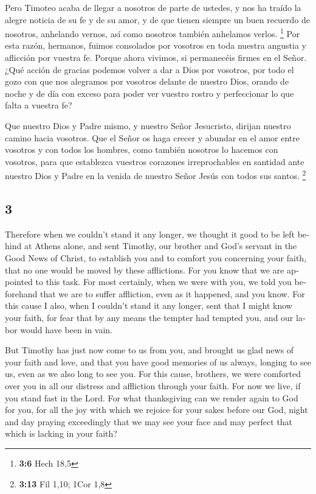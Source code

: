 \begin{paracol}{2}
 Pero Timoteo acaba de llegar a nosotros de parte de
ustedes, y nos ha traído la alegre noticia de su fe y de su amor, y de
que tienen siempre un buen recuerdo de nosotros, anhelando vernos, así
como nosotros también anhelamos verlos. \footnote{\textbf{3:6} Hech 18,5}
 Por esta razón, hermanos, fuimos consolados por vosotros
en toda nuestra angustia y aflicción por vuestra fe. 
Porque ahora vivimos, si permanecéis firmes en el Señor. 
¿Qué acción de gracias podemos volver a dar a Dios por vosotros, por
todo el gozo con que nos alegramos por vosotros delante de nuestro Dios,
 orando de noche y de día con exceso para poder ver
vuestro rostro y perfeccionar lo que falta a vuestra fe?

 Que nuestro Dios y Padre mismo, y nuestro Señor
Jesucristo, dirijan nuestro camino hacia vosotros.  Que
el Señor os haga crecer y abundar en el amor entre vosotros y con todos
los hombres, como también nosotros lo hacemos con vosotros,
 para que establezca vuestros corazones irreprochables en
santidad ante nuestro Dios y Padre en la venida de nuestro Señor Jesús
con todos sus santos. \footnote{\textbf{3:13} Fil 1,10; 1Cor 1,8}

\switchcolumn
\begin{otherlanguage}{english}

\hypertarget{section-5}{%
\section{3}\label{section-5}}

 Therefore when we couldn't stand it any longer, we
thought it good to be left behind at Athens alone,  and
sent Timothy, our brother and God's servant in the Good News of Christ,
to establish you and to comfort you concerning your faith,
 that no one would be moved by these afflictions. For you
know that we are appointed to this task.  For most
certainly, when we were with you, we told you beforehand that we are to
suffer affliction, even as it happened, and you know.  For
this cause I also, when I couldn't stand it any longer, sent that I
might know your faith, for fear that by any means the tempter had
tempted you, and our labor would have been in vain.

 But Timothy has just now come to us from you, and brought
us glad news of your faith and love, and that you have good memories of
us always, longing to see us, even as we also long to see you.
 For this cause, brothers, we were comforted over you in
all our distress and affliction through your faith.  For
now we live, if you stand fast in the Lord.  For what
thanksgiving can we render again to God for you, for all the joy with
which we rejoice for your sakes before our God,  night
and day praying exceedingly that we may see your face and may perfect
that which is lacking in your faith?


\end{otherlanguage}
\end{paracol}
